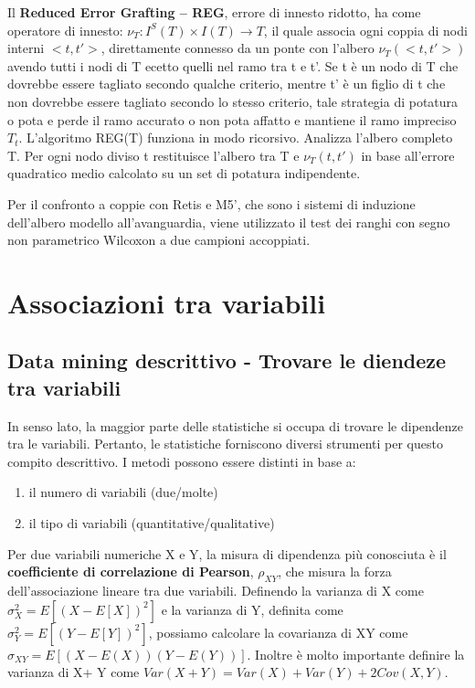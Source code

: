 \documentclass[a4paper]{extarticle}
\begin{document}
Il \textbf{ Reduced Error Grafting – REG}, errore di innesto ridotto, ha come operatore di innesto: $\nu_T : I^S(T) \times I(T) \rightarrow T$, il quale associa ogni coppia di nodi interni $<t,t'>$, direttamente connesso da un ponte con l'albero $\nu_T (<t,t'>)$ avendo tutti i nodi di T ecetto quelli nel ramo tra t e t'. Se t è un nodo di T che dovrebbe essere tagliato secondo qualche criterio, mentre t' è un figlio di t che non dovrebbe essere tagliato secondo lo stesso criterio, tale strategia di potatura o pota e perde il ramo accurato o non pota affatto e mantiene il ramo impreciso $T_t$. L'algoritmo REG(T) funziona in modo ricorsivo. Analizza l'albero completo T. Per ogni nodo diviso t restituisce l'albero tra T e $\nu_T (t,t')$ in base all'errore quadratico medio calcolato su un set di potatura indipendente.

Per il confronto a coppie con Retis e M5', che sono i sistemi di induzione dell'albero modello all'avanguardia, viene utilizzato il test dei ranghi con segno non parametrico Wilcoxon a due campioni accoppiati.

\section{Associazioni tra variabili}
\subsection{Data mining descrittivo - Trovare le diendeze tra variabili}

In senso lato, la maggior parte delle statistiche si occupa di trovare le dipendenze tra le variabili. Pertanto, le statistiche forniscono diversi strumenti per questo compito descrittivo. I metodi possono essere distinti in base a:
\begin{enumerate}
\item il numero di variabili (due/molte)
\item il tipo di variabili (quantitative/qualitative)
\end{enumerate}

Per due variabili numeriche X e Y, la misura di dipendenza più conosciuta è il \textbf{coefficiente di correlazione di Pearson}, $\rho_{XY}$, che misura la forza dell’associazione lineare tra due variabili. Definendo la varianza di X come $\sigma^2_X = E[(X - E[X])^2]$ e la varianza di Y, definita come $\sigma^2_Y = E[(Y - E[Y])^2]$, possiamo calcolare la covarianza di XY come $\sigma_{XY} = E[(X - E(X))(Y-E(Y))]$. Inoltre è molto importante definire la varianza di X+ Y come $Var( X + Y) = Var( X ) + Var( Y )+2Cov(X,Y)$.
\end{document}
